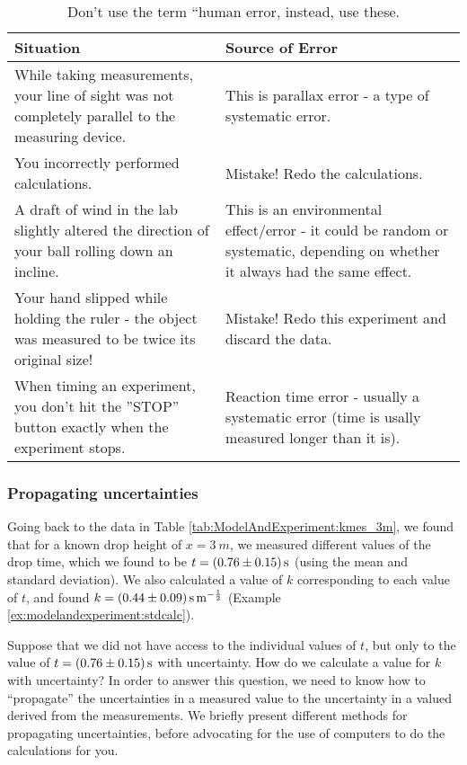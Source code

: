 \begin{table}[!h]
\centering
\begin{tabular}{p{3in}p{3in}} 
\textbf{Situation} &\textbf{Source of Error} \\
\hline
\hline
While taking measurements, your line of sight was not completely parallel to the measuring device. & This is parallax error - a type of systematic error.\\ \hline
You incorrectly performed calculations. & Mistake! Redo the calculations.\\ \hline
A draft of wind in the lab slightly altered the direction of your ball rolling down an incline. & This is an environmental effect/error - it could be random or systematic, depending on whether it always had the same effect.\\ \hline
Your hand slipped while holding the ruler - the object was measured to be twice its original size! & Mistake! Redo this experiment and discard the data.\\ \hline
When timing an experiment, you don't hit the ''STOP'' button exactly when the experiment stops. & Reaction time error - usually a systematic error (time is usally measured longer than it is).\\ \hline
\end{tabular}
\caption{\label{tab:ModelAndExperiment:uncertainties} Don't use the term ``human error, instead, use these.}
\end{table}

\subsubsection{Propagating uncertainties}
Going back to the data in Table \ref{tab:ModelAndExperiment:kmes_3m}, we found that for a known drop height of $x=\SI{3}{m}$, we measured different values of the drop time, which we found to be $t=\SI{0.76 \pm 0.15}{s}$ (using the mean and standard deviation). We also calculated a value of $k$ corresponding to each value of $t$, and found $k=\SI{0.44 \pm 0.09}{s.m^{-\frac{1}{2}}}$ (Example \ref{ex:modelandexperiment:stdcalc}).

Suppose that we did not have access to the individual values of $t$, but only to the value of $t=\SI{0.76 \pm 0.15}{s}$ with uncertainty. How do we calculate a value for $k$ with uncertainty? In order to answer this question, we need to know how to ``propagate'' the uncertainties in a measured value to the uncertainty in a valued derived from the measurements. We briefly present different methods for propagating uncertainties, before advocating for the use of computers to do the calculations for you.

